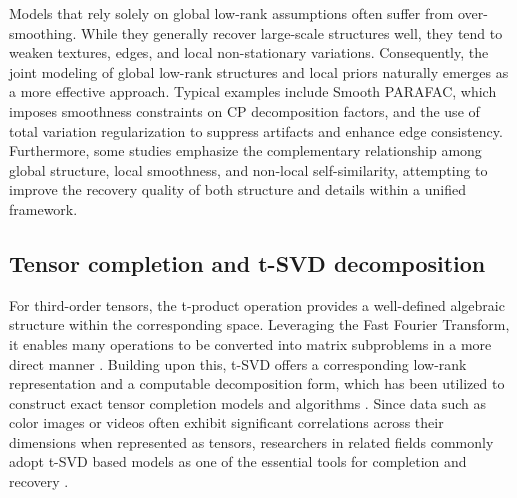 \documentclass[a4paper,12pt]{article}
\numberwithin{equation}{section}
\numberwithin{algorithm}{section}
\theoremstyle{remark}
\theoremstyle{definition}
\begin{document}
Models that rely solely on global low-rank assumptions often suffer from over-smoothing. While they generally recover large-scale structures well, they tend to weaken textures, edges, and local non-stationary variations. Consequently, the joint modeling of global low-rank structures and local priors naturally emerges as a more effective approach. Typical examples include Smooth PARAFAC\cite{yokota2016smooth}, which imposes smoothness constraints on CP decomposition factors, and the use of total variation regularization to suppress artifacts and enhance edge consistency\cite{rudin1992rof,li2017tv}. Furthermore, some studies emphasize the complementary relationship among global structure, local smoothness, and non-local self-similarity, attempting to improve the recovery quality of both structure and details within a unified framework\cite{zhao2021complementary,yuan2019tensor}.





\subsection{Tensor completion and  t-SVD decomposition}
For third-order tensors, the  t-product operation provides a well-defined algebraic structure within the corresponding space. Leveraging the Fast Fourier Transform, it enables many operations to be converted into matrix subproblems in a more direct manner \cite{kilmer2011factorization,kilmer2013operators}. Building upon this,  t-SVD offers a corresponding low-rank representation and a computable decomposition form, which has been utilized to construct exact tensor completion models and algorithms \cite{zhang2017tsvd}. Since data such as color images or videos often exhibit significant correlations across their dimensions when represented as tensors, researchers in related fields commonly adopt  t-SVD based models as one of the essential tools for completion and recovery \cite{panagakis2021tensorcvdl}.
\end{document}
